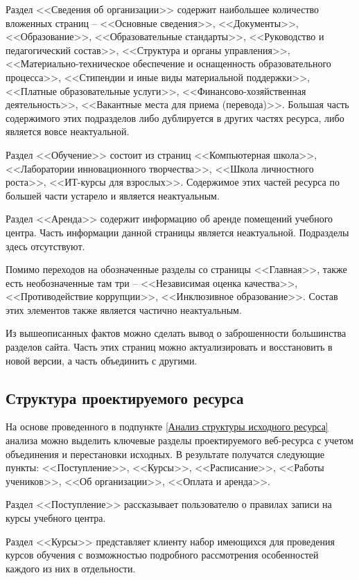 Раздел <<Сведения об организации>> содержит наибольшее количество вложенных страниц -- <<Основные сведения>>, <<Документы>>, <<Образование>>, <<Образовательные стандарты>>, <<Руководство и педагогический состав>>, <<Структура и органы управления>>, <<Материально-техническое обеспечение и оснащенность образовательного процесса>>, <<Стипендии и иные виды материальной поддержки>>, <<Платные образовательные услуги>>, <<Финансово-хозяйственная деятельность>>, <<Вакантные места для приема (перевода)>>.
Большая часть содержимого этих подразделов либо дублируется в других частях ресурса, либо является вовсе неактуальной.

Раздел <<Обучение>> состоит из страниц <<Компьютерная школа>>, <<Лаборатории инновационного творчества>>, <<Школа личностного роста>>, <<ИТ-курсы для взрослых>>.
Содержимое этих частей ресурса по большей части устарело и является неактуальным.

Раздел <<Аренда>> содержит информацию об аренде помещений учебного центра.
Часть информации данной страницы является неактуальной.
Подразделы здесь отсутствуют.

Помимо переходов на обозначенные разделы со страницы <<Главная>>, также есть необозначенные там три -- <<Независимая оценка качества>>, <<Противодействие коррупции>>, <<Инклюзивное образование>>.
Состав этих элементов также является частично неактуальным.

Из вышеописанных фактов можно сделать вывод о заброшенности большинства разделов сайта.
Часть этих страниц можно актуализировать и восстановить в новой версии, а часть объединить с другими.


\subsection{Структура проектируемого ресурса}

На основе проведенного в подпункте \ref{Анализ структуры исходного ресурса} анализа можно выделить ключевые разделы проектируемого веб-ресурса с учетом объединения и перестановки исходных.
В результате получатся следующие пункты: <<Поступление>>, <<Курсы>>, <<Расписание>>, <<Работы учеников>>, <<Об организации>>, <<Оплата и аренда>>.

Раздел <<Поступление>> рассказывает пользователю о правилах записи на курсы учебного центра.

Раздел <<Курсы>> представляет клиенту набор имеющихся для проведения курсов обучения с возможностью подробного рассмотрения особенностей каждого из них в отдельности.

